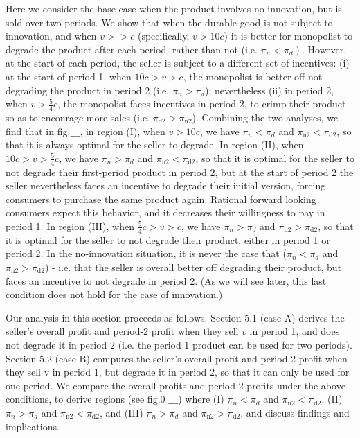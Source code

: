 \documentclass{article}
\begin{document}
Here we consider the base case when the product involves no innovation, but is sold over two periods. We show that when the durable good is not subject
to innovation, and when \(v>>c\) (specifically, \(v>10c\)) it is better for monopolist to degrade the product after each period, rather than not
(i.e. \(\left.\pi _n<\pi _d\right)\). However, at the start of each period, the seller is subject to a different set of incentives: { }(i) at the
start of period 1, when \(10c>v>c\), the monopolist is better off not degrading the product in period 2 (i.e. \(\pi _n>\pi _d\)); nevertheless (ii)
in period 2, when \(v>\frac{5}{4}c\), the monopolist faces incentives in period 2, to crimp their product so as to encourage more sales (i.e. \(\pi
_{\text{d2}}>\pi _{\text{n2}}\)). Combining the two analyses, we find that in fig.$\_\_\_$, in region (I), when \(v>10c\), we have \(\pi _n<\pi _d\)
and \(\pi _{\text{n2}}<\pi _{\text{d2}}\), so that it is always optimal for the seller to degrade. In region (II), when \(10c>v>\frac{5}{4}c\), we
have \(\pi _n>\pi _d\) and \(\pi _{\text{n2}}<\pi _{\text{d2}}\), so that it is optimal for the seller to not degrade their first-period product
in period 2, but at the start of period 2 the seller nevertheless faces an incentive to degrade their initial version, forcing consumers to purchase
the same product again. Rational forward looking consumers expect this behavior, and it decreases their willingness to pay in period 1. In region
(III), when \(\frac{5}{4}c>v>c\), { }we have \(\pi _n>\pi _d\) and \(\pi _{\text{n2}}>\pi _{\text{d2}}\), so that it is optimal for the seller to
not degrade their product, either in period 1 or period 2. In the no-innovation situation, it is never the case that (\(\pi _n<\pi _d\) and \(\pi
_{\text{n2}}>\pi _{\text{d2}}\)) - i.e. that the seller is overall better off degrading their product, but faces an incentive to not degrade in period
2. (As we will see later, this last condition does not hold for the case of innovation.)

Our analysis in this section proceeds as follows. Section 5.1 (case A) derives the seller{'}s overall profit and period-2 profit when they sell \(v\)
in period 1, and does not degrade it in period 2 (i.e. the period 1 product can be used for two periods). Section 5.2 (case B) computes the seller{'}s
overall profit and period-2 profit when they sell v in period 1, but degrade it in period 2, so that it can only be used for one period. We compare
the overall profits and period-2 profits under the above conditions, to derive regions (see fig.0 $\_\_\_$) where (I) \(\pi _n<\pi _d\) and \(\pi
_{\text{n2}}<\pi _{\text{d2}}\), (II) \(\pi _n>\pi _d\) and \(\pi _{\text{n2}}<\pi _{\text{d2}}\), and (III) \(\pi _n>\pi _d\) and \(\pi _{\text{n2}}>\pi
_{\text{d2}}\), and discuss findings and implications.
\end{document}
